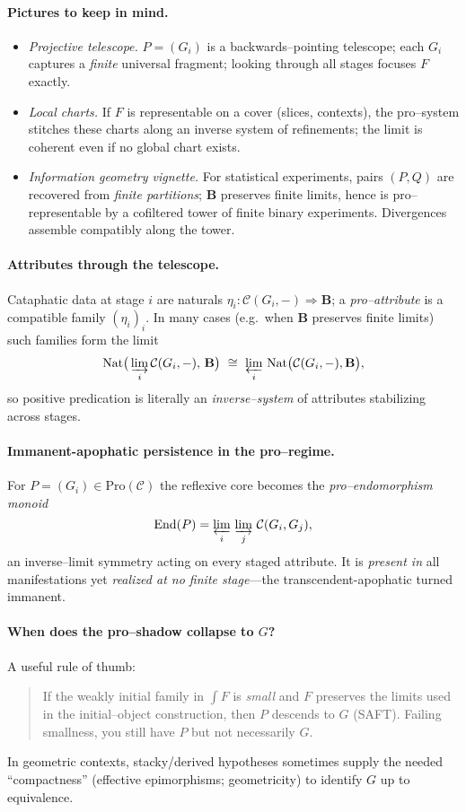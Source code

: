 \documentclass[11pt]{article}
\theoremstyle{upright}
\begin{document}
\paragraph{Pictures to keep in mind.}
\begin{itemize}[leftmargin=2em]
\item \emph{Projective telescope.} $P=(G_i)$ is a backwards–pointing telescope; each $G_i$ captures a \emph{finite} universal fragment; looking through all stages focuses $F$ exactly.
\item \emph{Local charts.} If $F$ is representable on a cover (slices, contexts), the pro–system stitches these charts along an inverse system of refinements; the limit is coherent even if no global chart exists.
\item \emph{Information geometry vignette.} For statistical experiments, pairs $(P,Q)$ are recovered from \emph{finite partitions}; $\mathbf B$ preserves finite limits, hence is pro–representable by a cofiltered tower of finite binary experiments. Divergences assemble compatibly along the tower.
\end{itemize}

\paragraph{Attributes through the telescope.}
Cataphatic data at stage $i$ are naturals $\eta_i:\mathcal C(G_i,-)\Rightarrow \mathbf B$; a \emph{pro–attribute} is a compatible family $(\eta_i)_i$. In many cases (e.g.\ when $\mathbf B$ preserves finite limits) such families form the limit
\[
\mathrm{Nat}\big(\varinjlim_i \mathcal C(G_i,-),\,\mathbf B\big)\ \cong\ \varprojlim_i\,\mathrm{Nat}\big(\mathcal C(G_i,-),\mathbf B\big),
\]
so positive predication is literally an \emph{inverse–system} of attributes stabilizing across stages.

\paragraph{Immanent-apophatic persistence in the pro–regime.}
For $P=(G_i)\in\mathrm{Pro}(\mathcal C)$ the reflexive core becomes the \emph{pro–endomorphism monoid}
\[
\mathrm{End}(P)=\varprojlim_{i}\,\varinjlim_{j}\,\mathcal C(G_i,G_j),
\]
an inverse–limit symmetry acting on every staged attribute. It is \emph{present in} all manifestations yet \emph{realized at no finite stage}—the transcendent-apophatic turned immanent.

\paragraph{When does the pro–shadow collapse to $G$?}
A useful rule of thumb:
\begin{quote}
If the weakly initial family in $\int F$ is \emph{small} and $F$ preserves the limits used in the initial–object construction, then $P$ descends to $G$ (SAFT). Failing smallness, you still have $P$ but not necessarily $G$.
\end{quote}
In geometric contexts, stacky/derived hypotheses sometimes supply the needed ``compactness'' (effective epimorphisms; geometricity) to identify $G$ up to equivalence.
\end{document}

